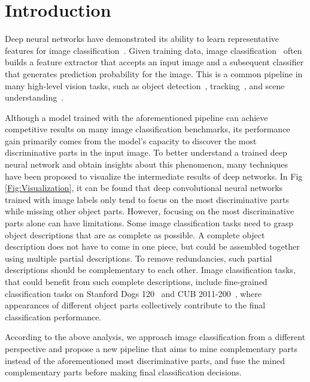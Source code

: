 \documentclass[10pt,twocolumn,letterpaper]{article}
\begin{document}
\section{Introduction}
Deep neural networks have demonstrated its ability to learn representative features for image classification~\cite{russakovsky2015imagenet, krizhevsky2012imagenet, simonyan2014very, szegedy2015going, he2016deep}. Given training data, image classification~\cite{everingham2010pascal, krizhevsky2012imagenet} often builds a feature extractor that accepts an input image and a subsequent classifier that generates prediction probability for the image. This is a common pipeline in many high-level vision tasks, such as object detection~\cite{felzenszwalb2008discriminatively, girshick2014rich,he2017mask}, tracking~\cite{Teng_2017_ICCV,Ristani_2018_CVPR,Sun_2018_CVPR}, and scene understanding~\cite{Dvornik_2017_ICCV,Lu_2018_CVPR}.

Although a model trained with the aforementioned pipeline can achieve competitive results on many image classification benchmarks, its performance gain primarily comes from the model's capacity to discover the most discriminative parts in the input image. To better understand a trained deep neural network and obtain insights about this phenomenon, many techniques~\cite{bach2015pixel,zhou2016learning,bau2017network} have been proposed to visualize the intermediate results of deep networks. In Fig \ref{Fig:Visualization}, it can be found that deep convolutional neural networks trained with image labels only tend to focus on the most discriminative parts while missing other object parts. However, focusing on the most discriminative parts alone can have limitations. Some image classification tasks need to grasp object descriptions that are as complete as possible. A complete object description does not have to come in one piece, but could be assembled together using multiple partial descriptions. To remove redundancies, such partial descriptions should be complementary to each other. Image classification tasks, that could benefit from such complete descriptions, include fine-grained classification tasks on Stanford Dogs 120~\cite{KhoslaYaoJayadevaprakashFeiFei_FGVC2011} and CUB 2011-200~\cite{WelinderEtal2010}, where appearances of different object parts collectively contribute to the final classification performance.

According to the above analysis, we approach image classification from a different perspective and propose a new pipeline that aims to mine complementary parts instead of the aforementioned most discriminative parts, and fuse the mined complementary parts before making final classification decisions.
\end{document}

